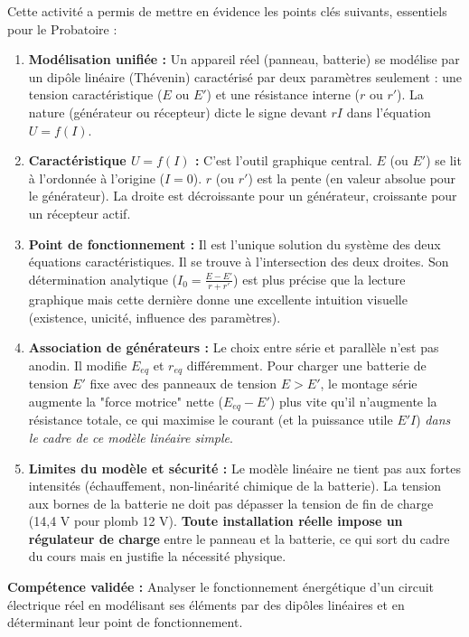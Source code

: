 \documentclass[11pt]{article}
\newcommand{\cle}[1]{{\popxbold\color{popdark}#1}}
\newcounter{popsec}
\newcounter{popsub}
\newcommand{\courssub}[1]{%
  \stepcounter{popsub}%
  \par\vspace{9pt}\noindent{\popxbold\fontsize{11.5}{13}\selectfont\color{popink}{\color{poporange}\thepopsec.\thepopsub}\hspace{6pt}#1}\par\nopagebreak\vspace{4pt}
}
\begin{document}
\courssub{Bilan de l'activité}
Cette activité a permis de mettre en évidence les points clés suivants, essentiels pour le Probatoire :
\begin{enumerate}
    \item \textbf{Modélisation unifiée :} Un appareil réel (panneau, batterie) se modélise par un dipôle linéaire (Thévenin) caractérisé par deux paramètres seulement : une tension caractéristique (\cle{$E$} ou \cle{$E'$}) et une résistance interne (\cle{$r$} ou \cle{$r'$}). La nature (générateur ou récepteur) dicte le signe devant \cle{$rI$} dans l'équation \cle{$U = f(I)$}.
    \item \textbf{Caractéristique \cle{$U = f(I)$} :} C'est l'outil graphique central. \cle{$E$} (ou \cle{$E'$}) se lit à l'ordonnée à l'origine (\cle{$I=0$}). \cle{$r$} (ou \cle{$r'$}) est la pente (en valeur absolue pour le générateur). La droite est décroissante pour un générateur, croissante pour un récepteur actif.
    \item \textbf{Point de fonctionnement :} Il est l'unique solution du système des deux équations caractéristiques. Il se trouve à l'intersection des deux droites. Son détermination analytique (\cle{$I_0 = \frac{E-E'}{r+r'}$}) est plus précise que la lecture graphique mais cette dernière donne une excellente intuition visuelle (existence, unicité, influence des paramètres).
    \item \textbf{Association de générateurs :} Le choix entre série et parallèle n'est pas anodin. Il modifie \cle{$E_{eq}$} et \cle{$r_{eq}$} différemment. Pour charger une batterie de tension \cle{$E'$} fixe avec des panneaux de tension \cle{$E > E'$}, le montage série augmente la "force motrice" nette (\cle{$E_{eq}-E'$}) plus vite qu'il n'augmente la résistance totale, ce qui maximise le courant (et la puissance utile \cle{$E'I$}) \emph{dans le cadre de ce modèle linéaire simple}.
    \item \textbf{Limites du modèle et sécurité :} Le modèle linéaire ne tient pas aux fortes intensités (échauffement, non-linéarité chimique de la batterie). La tension aux bornes de la batterie ne doit pas dépasser la tension de fin de charge (14,4 V pour plomb 12 V). \textbf{Toute installation réelle impose un régulateur de charge} entre le panneau et la batterie, ce qui sort du cadre du cours mais en justifie la nécessité physique.
\end{enumerate}
\textbf{Compétence validée :} \og Analyser le fonctionnement énergétique d'un circuit électrique réel en modélisant ses éléments par des dipôles linéaires et en déterminant leur point de fonctionnement. \fg
\end{document}
